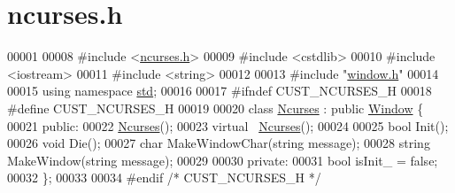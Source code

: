 \hypertarget{ncurses_8h_source}{}\section{ncurses.\+h}

\begin{DoxyCode}
00001 
00008 \textcolor{preprocessor}{#include <\mbox{\hyperlink{ncurses_8h}{ncurses.h}}>}
00009 \textcolor{preprocessor}{#include <cstdlib>}
00010 \textcolor{preprocessor}{#include <iostream>}
00011 \textcolor{preprocessor}{#include <string>}
00012 
00013 \textcolor{preprocessor}{#include "\mbox{\hyperlink{window_8h}{window.h}}"}
00014 
00015 \textcolor{keyword}{using namespace }\mbox{\hyperlink{namespacestd}{std}};
00016 
00017 \textcolor{preprocessor}{#ifndef CUST\_NCURSES\_H}
00018 \textcolor{preprocessor}{#define CUST\_NCURSES\_H}
00019 
00020 \textcolor{keyword}{class }\mbox{\hyperlink{classNcurses}{Ncurses}} : \textcolor{keyword}{public} \mbox{\hyperlink{classWindow}{Window}} \{
00021  \textcolor{keyword}{public}:
00022   \mbox{\hyperlink{classNcurses}{Ncurses}}();
00023   \textcolor{keyword}{virtual} ~\mbox{\hyperlink{classNcurses}{Ncurses}}();
00024 
00025   \textcolor{keywordtype}{bool} Init();
00026   \textcolor{keywordtype}{void} Die();
00027   \textcolor{keywordtype}{char} MakeWindowChar(\textcolor{keywordtype}{string} message);
00028   \textcolor{keywordtype}{string} MakeWindow(\textcolor{keywordtype}{string} message);
00029 
00030  \textcolor{keyword}{private}:
00031   \textcolor{keywordtype}{bool} isInit\_ = \textcolor{keyword}{false};
00032 \};
00033 
00034 \textcolor{preprocessor}{#endif }\textcolor{comment}{/* CUST\_NCURSES\_H */}\textcolor{preprocessor}{}
\end{DoxyCode}

